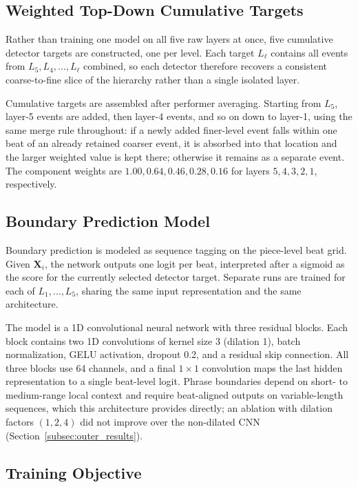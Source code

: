 \documentclass{article}
\begin{document}
\subsection{Weighted Top-Down Cumulative Targets}\label{subsec:cumulative_targets}

Rather than training one model on all five raw layers at once, five cumulative detector targets are constructed, one per level. Each target $L_\ell$ contains all events from $L_5, L_4, \ldots, L_\ell$ combined, so each detector therefore recovers a consistent coarse-to-fine slice of the hierarchy rather than a single isolated layer.

Cumulative targets are assembled after performer averaging. Starting from $L_5$, layer-5 events are added, then layer-4 events, and so on down to layer-1, using the same merge rule throughout: if a newly added finer-level event falls within one beat of an already retained coarser event, it is absorbed into that location and the larger weighted value is kept there; otherwise it remains as a separate event. The component weights are $1.00, 0.64, 0.46, 0.28, 0.16$ for layers $5,4,3,2,1$, respectively.

\subsection{Boundary Prediction Model}\label{subsec:model}

Boundary prediction is modeled as sequence tagging on the piece-level beat grid. Given $\mathbf{X}_i$, the network outputs one logit per beat, interpreted after a sigmoid as the score for the currently selected detector target. Separate runs are trained for each of $L_1, \ldots, L_5$, sharing the same input representation and the same architecture.

The model is a 1D convolutional neural network with three residual blocks. Each block contains two 1D convolutions of kernel size 3 (dilation 1), batch normalization, GELU activation, dropout 0.2, and a residual skip connection. All three blocks use 64 channels, and a final $1\times 1$ convolution maps the last hidden representation to a single beat-level logit. Phrase boundaries depend on short- to medium-range local context and require beat-aligned outputs on variable-length sequences, which this architecture provides directly; an ablation with dilation factors $(1,2,4)$ did not improve over the non-dilated CNN (Section~\ref{subsec:outer_results}).

\subsection{Training Objective}\label{subsec:training_objective}
\end{document}
